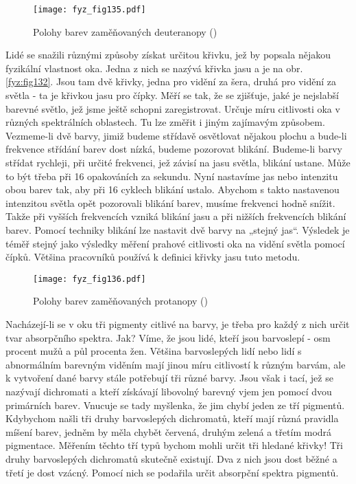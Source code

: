     \begin{figure}[ht!]   %
      \centering
      \texttt{[image: fyz\_fig135.pdf]}
      \caption{Polohy barev zaměňovaných deuteranopy
              (\cite[s.~476]{Feynman01})}
      \label{fyz:fig135}
    \end{figure}
    Lidé se snažili různými způsoby získat určitou křivku, jež by popsala 
    nějakou fyzikální vlastnost oka. Jedna z nich se nazývá křivka jasu a je na obr. 
    \ref{fyz:fig132}. Jsou tam dvě křivky, jedna pro vidění za šera, druhá pro vidění za světla - 
    ta je křivkou jasu pro čípky. Měří se tak, že se zjišťuje, jaké je nejslabší barevné světlo, 
    jež jsme ještě schopni zaregistrovat. Určuje míru citlivosti oka v různých spektrálních 
    oblastech. Tu lze změřit i jiným zajímavým způsobem. Vezmeme-li dvě barvy, jimiž budeme 
    střídavě osvětlovat nějakou plochu a bude-li frekvence střídání barev dost nízká, budeme 
    pozorovat blikání. Budeme-li barvy střídat rychleji, při určité frekvenci, jež závisí na jasu 
    světla, blikání ustane. Může to být třeba při \num{16} opakováních za sekundu. Nyní nastavíme 
    jas nebo intenzitu obou barev tak, aby při \num{16} cyklech blikání ustalo. Abychom s takto 
    nastavenou intenzitou světla opět pozorovali blikání barev, musíme frekvenci hodně snížit. 
    Takže při vyšších frekvencích vzniká blikání jasu a při nižších frekvencích blikání barev. 
    Pomocí techniky blikání lze nastavit dvě barvy na „stejný jas“. Výsledek je téměř stejný jako 
    výsledky měření prahové citlivosti oka na vidění světla pomocí čípků. Většina pracovníků 
    používá k definici křivky jasu tuto metodu.

    \begin{figure}[ht!]  %
      \centering
      \texttt{[image: fyz\_fig136.pdf]}
      \caption{Polohy barev zaměňovaných protanopy
              (\cite[s.~477]{Feynman01})}
      \label{fyz:fig136}
    \end{figure}
    Nacházejí-li se v oku tři pigmenty citlivé na barvy, je třeba pro každý z nich určit tvar 
    absorpčního spektra. Jak? Víme, že jsou lidé, kteří jsou barvoslepí - osm procent mužů a půl 
    procenta žen. Většina barvoslepých lidí nebo lidí s abnormálním barevným viděním mají jinou 
    míru citlivostí k různým barvám, ale k vytvoření dané barvy stále potřebují tři různé barvy. 
    Jsou však i tací, jež se nazývají dichromati a kteří získávají libovolný barevný vjem jen 
    pomocí dvou primárních barev. Vnucuje se tady myšlenka, že jim chybí jeden ze tří pigmentů. 
    Kdybychom našli tři druhy barvoslepých dichromatů, kteří mají různá pravidla míšení barev, 
    jedněm by měla chybět červená, druhým zelená a třetím modrá pigmentace. Měřením těchto tří typů 
    bychom mohli určit tři hledané křivky! Tři druhy barvoslepých dichromatů skutečně existují. Dva 
    z nich jsou dost běžné a třetí je dost vzácný. Pomocí nich se podařila určit absorpční spektra 
    pigmentů.


